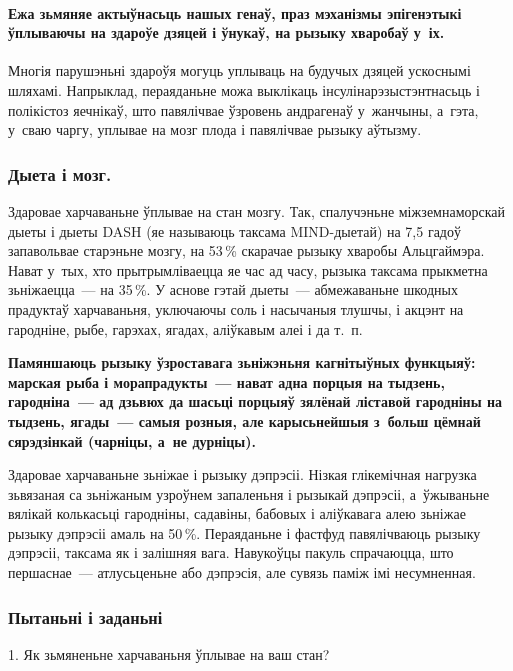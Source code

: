 \paragraph{Ежа зьмяняе актыўнасьць нашых генаў, праз мэханізмы эпігенэтыкі ўплываючы на здароўе дзяцей і ўнукаў, на рызыку хваробаў у~іх.} Многія парушэньні здароўя могуць уплываць на будучых дзяцей ускоснымі шляхамі. Напрыклад, пераяданьне можа выклікаць інсулінарэзыстэнтнасьць і полікістоз яечнікаў, што павялічвае ўзровень андрагенаў у~жанчыны, а~гэта, у~сваю чаргу, уплывае на мозг плода і павялічвае рызыку аўтызму.

\subsubsection{Дыета і мозг.}
Здаровае харчаваньне ўплывае на стан мозгу. Так, спалучэньне міжземнаморскай дыеты і дыеты DASH (яе называюць таксама MIND-дыетай) на 7,5 гадоў запавольвае старэньне мозгу, на 53\,\% скарачае рызыку хваробы Альцгаймэра. Нават у~тых, хто прытрымліваецца яе час ад часу, рызыка таксама прыкметна зьніжаецца~--- на 35\,\%. У аснове гэтай дыеты~--- абмежаваньне шкодных прадуктаў харчаваньня, уключаючы соль і насычаныя тлушчы, і акцэнт на гародніне, рыбе, гарэхах, ягадах, аліўкавым алеі і да т.~п.

\textbf{Памяншаюць рызыку ўзроставага зьніжэньня кагнітыўных функцыяў: марская рыба і морапрадукты~--- нават адна порцыя на тыдзень, гародніна~--- ад дзьвюх да шасьці порцыяў зялёнай ліставой гародніны на тыдзень, ягады~--- самыя розныя, але карысьнейшыя з~больш цёмнай сярэдзінкай (чарніцы, а~не дурніцы).}

Здаровае харчаваньне зьніжае і рызыку дэпрэсіі. Нізкая глікемічная нагрузка зьвязаная са зьніжаным узроўнем запаленьня і рызыкай дэпрэсіі, а~ўжываньне вялікай колькасьці гародніны, садавіны, бабовых і аліўкавага алею зьніжае рызыку дэпрэсіі амаль на 50\,\%. Пераяданьне і фастфуд павялічваюць рызыку дэпрэсіі, таксама як і залішняя вага. Навукоўцы пакуль спрачаюцца, што першаснае~--- атлусьценьне або дэпрэсія, але сувязь паміж імі несумненная.

\subsubsection{Пытаньні і заданьні}

1. Як зьмяненьне харчаваньня ўплывае на ваш стан?


